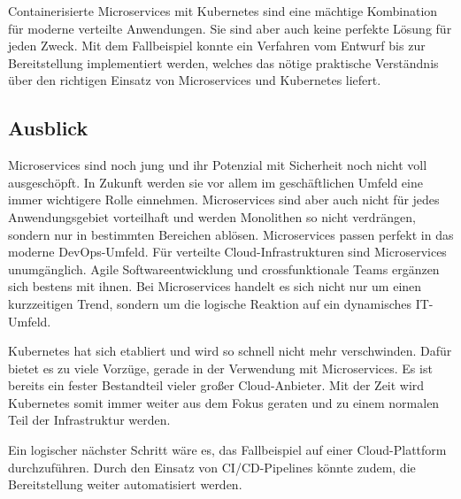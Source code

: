 Containerisierte Microservices mit Kubernetes sind eine mächtige Kombination für moderne verteilte Anwendungen. Sie sind aber auch keine perfekte Lösung für jeden Zweck. Mit dem Fallbeispiel konnte ein Verfahren vom Entwurf bis zur Bereitstellung implementiert werden, welches das nötige praktische Verständnis über den richtigen Einsatz von Microservices und Kubernetes liefert.

\subsection{Ausblick}

Microservices sind noch jung und ihr Potenzial mit Sicherheit noch nicht voll ausgeschöpft. In Zukunft werden sie vor allem im geschäftlichen Umfeld eine immer wichtigere Rolle einnehmen. Microservices sind aber auch nicht für jedes Anwendungsgebiet vorteilhaft und werden Monolithen so nicht verdrängen, sondern nur in bestimmten Bereichen ablösen. Microservices passen perfekt in das moderne DevOps-Umfeld. Für verteilte Cloud-Infrastrukturen sind Microservices unumgänglich. Agile Softwareentwicklung und crossfunktionale Teams ergänzen sich bestens mit ihnen. Bei Microservices handelt es sich nicht nur um einen kurzzeitigen Trend, sondern um die logische Reaktion auf ein dynamisches IT-Umfeld.

Kubernetes hat sich etabliert und wird so schnell nicht mehr verschwinden. Dafür bietet es zu viele Vorzüge, gerade in der Verwendung mit Microservices. Es ist bereits ein fester Bestandteil vieler großer Cloud-Anbieter. Mit der Zeit wird Kubernetes somit immer weiter aus dem Fokus geraten und zu einem normalen Teil der Infrastruktur werden.

Ein logischer nächster Schritt wäre es, das Fallbeispiel auf einer Cloud-Plattform durchzuführen. Durch den Einsatz von CI/CD-Pipelines könnte zudem, die Bereitstellung weiter automatisiert werden.
